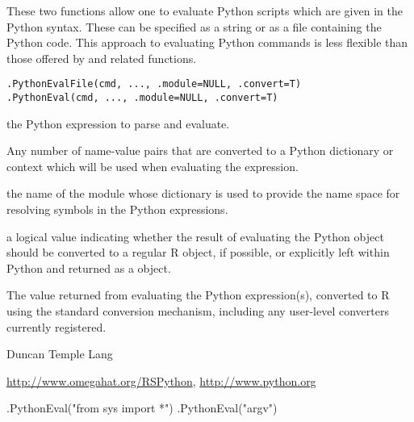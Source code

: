 \begin{Description}\relax
These two functions allow one to evaluate Python scripts
which are given in the Python syntax. These can be specified
as a string or as a file containing the Python code.
This approach to evaluating Python commands is less
flexible than those offered by 
and related functions.\end{Description}
\begin{Usage}
\begin{verbatim}
.PythonEvalFile(cmd, ..., .module=NULL, .convert=T)
.PythonEval(cmd, ..., .module=NULL, .convert=T)
\end{verbatim}
\end{Usage}
\begin{Arguments}
\begin{ldescription}
\item[\code{cmd}] the Python expression to parse and evaluate.
\item[\code{...}] Any number of name-value pairs that are converted to a Python
dictionary or context which will be used when evaluating the expression. 
\item[\code{.module}] the name of the module whose dictionary is used to provide the name
space for resolving symbols in the Python expressions.
\item[\code{.convert}] a logical value indicating whether the result of evaluating the Python
object should be converted to a regular R object, if possible, or explicitly left
within Python and returned as a  object.
\end{ldescription}
\end{Arguments}
\begin{Details}\relax
\end{Details}
\begin{Value}
The value returned from evaluating the Python expression(s),
converted to R using the standard conversion mechanism, including
any user-level converters currently registered.\end{Value}
\begin{Author}\relax
Duncan Temple Lang\end{Author}
\begin{References}\relax
\url{http://www.omegahat.org/RSPython},
\url{http://www.python.org}\end{References}
\begin{SeeAlso}\relax
{}
\end{SeeAlso}
\begin{Examples}
\begin{ExampleCode}
 .PythonEval("from sys import *")
 .PythonEval("argv")
\end{ExampleCode}
\end{Examples}


